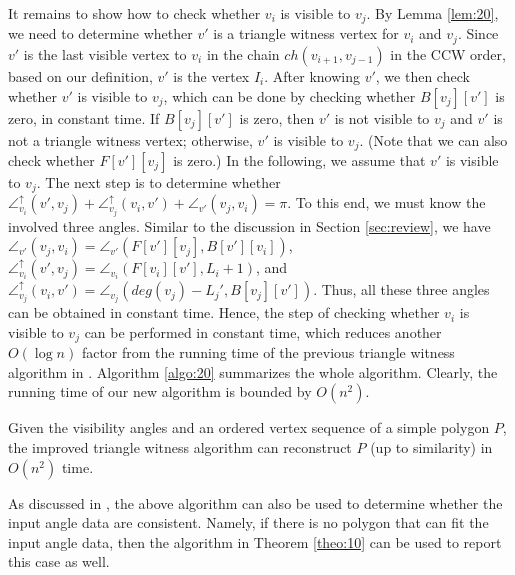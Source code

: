 \documentclass[11pt]{article}
\def\sangle{\angle^{\uparrow}}
\def\lemmaspace{\vspace*{0in}}
\begin{document}
It remains to show how to check whether $v_i$ is visible to $v_j$. 
By Lemma \ref{lem:20}, we need to determine whether
$v'$ is a triangle witness vertex for $v_i$ and $v_j$. Since $v'$ is the last visible
vertex to $v_i$ in the chain $ch(v_{i+1},v_{j-1})$ in the CCW order, 
based on our definition, $v'$ is the vertex $I_i$. After knowing
$v'$, we then check whether $v'$ is visible to $v_j$, which can be
done by checking whether $B[v_j][v']$ is zero, in constant time. 
If $B[v_j][v']$ is
zero, then $v'$ is not visible to $v_j$ and $v'$ is not a triangle
witness vertex; otherwise, $v'$ is visible to
$v_j$. (Note that we can also check whether $F[v'][v_j]$ is zero.)
In the following, we assume that $v'$ is visible to $v_j$. The next step is
to determine whether  
$\sangle_{v_i}(v',v_j)+\sangle_{v_j}(v_i,v')+\angle_{v'}(v_j,v_i)=\pi$.
To this end, we must know the involved three angles. Similar
to the discussion in Section \ref{sec:review}, we have 
$\angle_{v'}(v_j,v_i)=\angle_{v'}(F[v'][v_j],B[v'][v_i])$, 
$\sangle_{v_i}(v',v_j)=\angle_{v_i}(F[v_i][v'],L_i+1)$, and
$\sangle_{v_j}(v_i,v')=\angle_{v_j}(deg(v_j)-L_j',B[v_j][v'])$. 
Thus, all these three angles can be
obtained in constant time. Hence, the step of checking whether $v_i$
is visible to $v_j$ can be performed in constant time, which reduces
another $O(\log n)$ factor from the running time of the previous
triangle witness algorithm in \cite{ref:DisserRe10}.  
Algorithm \ref{algo:20} summarizes the whole algorithm. Clearly, the running
time of our new algorithm is bounded by $O(n^2)$. 

\lemmaspace
\begin{theorem}\label{theo:10}
Given the visibility angles and an ordered vertex sequence of a simple
polygon $P$, the improved triangle witness algorithm can reconstruct
$P$ (up to similarity) in $O(n^2)$ time. 
\end{theorem}
\lemmaspace

As discussed in \cite{ref:DisserRe10}, the above algorithm can also be used
to determine whether the input angle data are consistent. Namely, if
there is no polygon that can fit the input angle data, then 
the algorithm in Theorem \ref{theo:10} can be used to report this
case as well.
\end{document}
